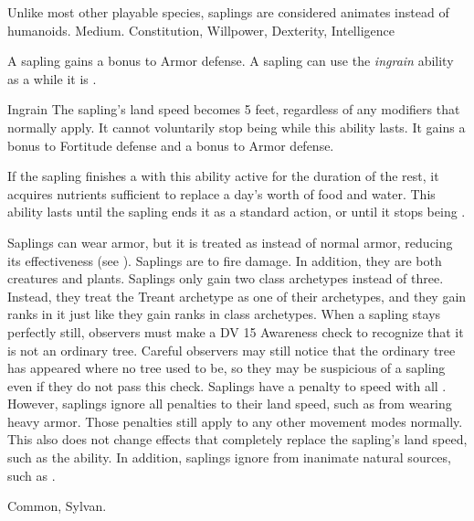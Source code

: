          Unlike most other playable species, saplings are considered animates instead of humanoids.
         Medium.
          Constitution,  Willpower,  Dexterity,  Intelligence
        \begin{itemize}
             A sapling gains a  bonus to Armor defense.
             A sapling can use the \textit{ingrain} ability as a  while it is .
                \begin{activeability}{Ingrain}
                    \rankline
                    The sapling's land speed becomes 5 feet, regardless of any modifiers that normally apply.
                    It cannot voluntarily stop being  while this ability lasts.
                    It gains a  bonus to Fortitude defense and a  bonus to Armor defense.

                    If the sapling finishes a  with this ability active for the duration of the rest, it acquires nutrients sufficient to replace a day's worth of food and water.
                    This ability lasts until the sapling ends it as a standard action, or until it stops being .
                \end{activeability}
             Saplings can wear armor, but it is treated as  instead of normal armor, reducing its effectiveness (see ).
             Saplings are \vulnerable to fire damage. In addition, they are both creatures and plants.
             Saplings only gain two class archetypes instead of three.
                Instead, they treat the Treant archetype as one of their archetypes, and they gain ranks in it just like they gain ranks in class archetypes.
             When a sapling stays perfectly still, observers must make a DV 15 Awareness check to recognize that it is not an ordinary tree.
            Careful observers may still notice that the ordinary tree has appeared where no tree used to be, so they may be suspicious of a sapling even if they do not pass this check.
             Saplings have a  penalty to speed with all .
                However, saplings ignore all penalties to their land speed, such as from wearing heavy armor.
                Those penalties still apply to any other movement modes normally.
                This also does not change effects that completely replace the sapling's land speed, such as the  ability.
                In addition, saplings ignore  from inanimate natural sources, such as .
        \end{itemize}
         Common, Sylvan.

